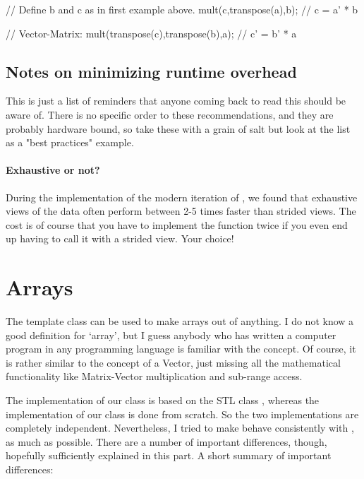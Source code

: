 \begin{code}
// Define b and c as in first example above.
mult(c,transpose(a),b);                      // c = a' * b

// Vector-Matrix:
mult(transpose(c),transpose(b),a);           // c' = b' * a
\end{code}

\subsection{Notes on minimizing runtime overhead}
This is just a list of reminders that anyone coming back to read this should be aware of.  There is
no specific order to these recommendations, and they are probably hardware bound, so take these with
a grain of salt but look at the list as a "best practices" example.

\paragraph{Exhaustive or not?}  During the implementation of the modern iteration of , we
found that exhaustive views of the data often perform between 2-5 times faster than strided views.  The cost
is of course that you have to implement the function twice if you even end up having to call it with a
strided view.  Your choice!


\section{Arrays}
\label{sec:matpack:arrays}

The template class  can be used to make arrays out of
anything. I do not know a good definition for `array', but I guess
anybody who has written a computer program in any programming language
is familiar with the concept. Of course, it is rather similar to the
concept of a Vector, just missing all the mathematical functionality
like Matrix-Vector multiplication and sub-range access.

The implementation of our  class is based on the STL class
, whereas the implementation of our 
class is done from scratch. So the two implementations are completely
independent. Nevertheless, I tried to make  behave
consistently with , as much as possible. There are a number
of important differences, though, hopefully sufficiently explained in
this part. A short summary of important differences:

